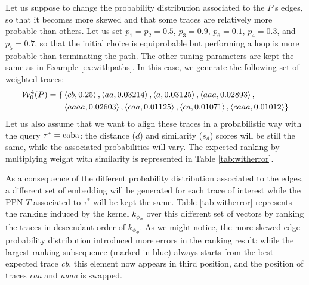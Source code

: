 \begin{example}\label{ex:moreskew}
	Let us suppose to change the probability distribution associated to the $P$'s edges, so that it becomes more skewed and that some traces are relatively more probable than others. Let us set $p_1=p_2=0.5$, $p_3=0.9$, $p_6=0.1$, $p_4=0.3$, and $p_5=0.7$, so that the initial choice is equiprobable but performing a loop is more probable than terminating the path. The other tuning parameters are kept the same as in Example \ref{ex:withpaths}. In this case, we generate the following set of weighted traces:
$$\begin{aligned}
	\mathcal{W}_0^4(P)=\{&\braket{cb,0.25},\braket{aa,0.03214},\braket{a,0.03125},\braket{aaa,0.02893},\\
	&\braket{aaaa,0.02603},\braket{caa,0.01125},\braket{ca,0.01071},\braket{caaa,0.01012}\}\\
\end{aligned}$$
	Let us also assume that we want to align these traces in a probabilistic way with the query $\tau^*=\textup{caba}$: the distance ($d$) and similarity ($s_d$) scores will be still the same, while the associated probabilities will vary. The expected ranking by multiplying weight with similarity is represented in Table \ref{tab:witherror}. 
	
	As a consequence of the different probability distribution associated to the edges, a different set of embedding will be generated for each trace of interest while the PPN $T$ associated to $\tau^*$ will be kept the same. Table \ref{tab:witherror} represents the ranking induced by the kernel $k_{\phi_{\mathcal{P}}}$ over this different set of vectors by ranking the traces in descendant order of $k_{\phi_{\mathcal{P}}}$. As we might notice, the more skewed edge probability  distribution introduced more errors in the ranking result: while the largest ranking subsequence (marked in blue) always starts from the best expected trace \textit{cb}, this element now appears in third position, and the position of traces \textit{caa} and \textit{aaaa} is swapped.  
 
\end{example}
